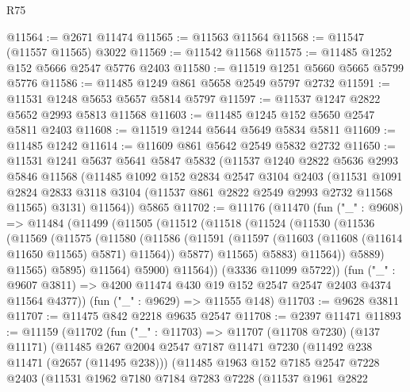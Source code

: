 \begin{lexlean}{R75}
\begin{coremodule}
@11564 := @2671 @11474
@11565 := @11563 @11564
@11568 := @11547 (@11557 @11565) @3022
@11569 := @11542 @11568
@11575 := @11485 @1252 @152 @5666 @2547 @5776 @2403
@11580 := @11519 @1251 @5660 @5665 @5799 @5776
@11586 := @11485 @1249 @861 @5658 @2549 @5797 @2732
@11591 := @11531 @1248 @5653 @5657 @5814 @5797
@11597 := @11537 @1247 @2822 @5652 @2993 @5813 @11568
@11603 := @11485 @1245 @152 @5650 @2547 @5811 @2403
@11608 := @11519 @1244 @5644 @5649 @5834 @5811
@11609 := @11485 @1242
@11614 := @11609 @861 @5642 @2549 @5832 @2732
@11650 := @11531
    @1241
    @5637
    @5641
    @5847
    @5832
    (@11537
      @1240
      @2822
      @5636
      @2993
      @5846
      @11568
      (@11485
        @1092
        @152
        @2834
        @2547
        @3104
        @2403
        (@11531
          @1091
          @2824
          @2833
          @3118
          @3104
          (@11537 @861 @2822 @2549 @2993 @2732 @11568 @11565)
          @3131)
        @11564))
    @5865
@11702 := @11176
    (@11470
      (fun ("_" : @9608) =>
      @11484
        (@11499
          (@11505
            (@11512
              (@11518
                (@11524
                  (@11530
                    (@11536
                      (@11569
                        (@11575
                          (@11580
                            (@11586
                              (@11591
                                (@11597 (@11603 (@11608 (@11614 @11650 @11565) @5871) @11564))
                                @5877)
                              @11565)
                            @5883)
                          @11564))
                      @5889)
                    @11565)
                  @5895)
                @11564)
              @5900)
            @11564))
        (@3336 @11099 @5722))
      (fun ("_" : @9607 @3811) => @4200 @11474 @430 @19 @152 @2547 @2547 @2403 @4374 @11564 @4377))
    (fun ("_" : @9629) => @11555 @148)
@11703 := @9628 @3811
@11707 := @11475 @842 @2218 @9635 @2547
@11708 := @2397 @11471
@11893 := @11159
    (@11702
      (fun ("_" : @11703) =>
      @11707
        (@11708 @7230)
        (@137 @11171)
        (@11485
          @267
          @2004
          @2547
          @7187
          @11471
          @7230
          (@11492 @238 @11471 (@2657 (@11495 @238)))
          (@11485
            @1963
            @152
            @7185
            @2547
            @7228
            @2403
            (@11531
              @1962
              @7180
              @7184
              @7283
              @7228
              (@11537
                @1961
                @2822

\end{coremodule}
\end{lexlean}
